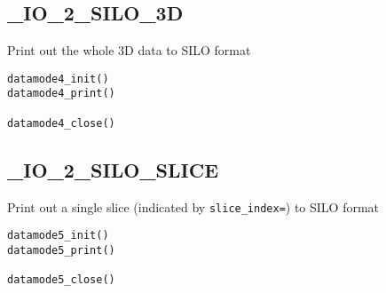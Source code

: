 \subsection{\_IO\_2\_SILO\_3D}

Print out the whole 3D data to SILO format
\begin{verbatim}
datamode4_init()
datamode4_print()

datamode4_close()
\end{verbatim}

\subsection{\_IO\_2\_SILO\_SLICE}

Print out a single slice (indicated by \verb!slice_index=!) to SILO format
\begin{verbatim}
datamode5_init()
datamode5_print()

datamode5_close()
\end{verbatim}